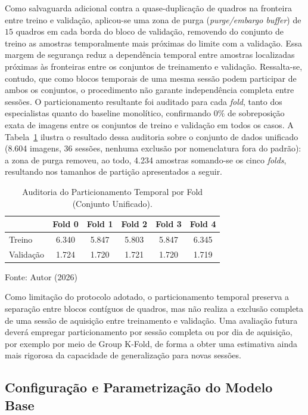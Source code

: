 \documentclass[12pt,fleqn]{article}
\begin{document}
Como salvaguarda adicional contra a quase-duplicação de quadros na fronteira entre treino e validação, aplicou-se uma zona de purga (\textit{purge/embargo buffer}) de $15$ quadros em cada borda do bloco de validação, removendo do conjunto de treino as amostras temporalmente mais próximas do limite com a validação. Essa margem de segurança reduz a dependência temporal entre amostras localizadas próximas às fronteiras entre os conjuntos de treinamento e validação. Ressalta-se, contudo, que como blocos temporais de uma mesma sessão podem participar de ambos os conjuntos, o procedimento não garante independência completa entre sessões. O particionamento resultante foi auditado para cada \textit{fold}, tanto dos especialistas quanto do baseline monolítico, confirmando $0\%$ de sobreposição exata de imagens entre os conjuntos de treino e validação em todos os casos. A Tabela~\ref{tab:kfold_auditoria} ilustra o resultado dessa auditoria sobre o conjunto de dados unificado (8.604 imagens, 36 sessões, nenhuma exclusão por nomenclatura fora do padrão): a zona de purga removeu, ao todo, 4.234 amostras somando-se os cinco \textit{folds}, resultando nos tamanhos de partição apresentados a seguir.

\begin{table}[H]
\caption{Auditoria do Particionamento Temporal por Fold (Conjunto Unificado).}
\label{tab:kfold_auditoria}
\centering{}
\begin{tabular*}{\textwidth}{@{\extracolsep{\fill}}lccccc}
\hline
 & Fold 0 & Fold 1 & Fold 2 & Fold 3 & Fold 4 \\
\hline
Treino & 6.340 & 5.847 & 5.803 & 5.847 & 6.345 \\
Validação & 1.724 & 1.720 & 1.721 & 1.720 & 1.719 \\
\hline
\end{tabular*}
{\footnotesize\centering Fonte: Autor (2026)\par}
\end{table}

Como limitação do protocolo adotado, o particionamento temporal preserva a separação entre blocos contíguos de quadros, mas não realiza a exclusão completa de uma sessão de aquisição entre treinamento e validação. Uma avaliação futura deverá empregar particionamento por sessão completa ou por dia de aquisição, por exemplo por meio de Group K-Fold, de forma a
obter uma estimativa ainda mais rigorosa da capacidade de generalização para novas sessões.

\subsection{Configuração e Parametrização do Modelo Base}
\label{subsec:config_modelo}
\end{document}
